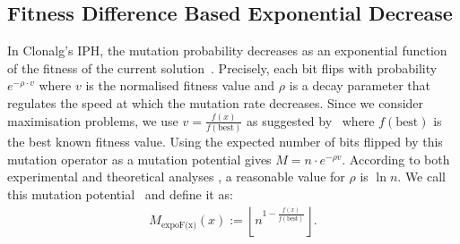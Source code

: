 \documentclass[lettersize,journal]{IEEEtran}
\begin{document}
 \subsection*{Fitness Difference Based Exponential Decrease}
 	In Clonalg's  %
 	IPH,  
 	the mutation probability decreases as an exponential function of the fitness of the current solution~\cite{DecastroVonzuben2002}. %
 	Precisely, each bit %
 	flips with probability $e^{-\rho \cdot v}$ where $v$ is the normalised fitness value and $\rho$ is a decay parameter that regulates the speed at which the mutation rate  decreases.
 Since we consider maximisation problems, we use $v=\frac{f(x)}{f(\text{best})}$ as suggested by~\cite{Zarges2008} where $f(\text{best})$ is the best known fitness value. Using the expected number of bits flipped by this mutation operator as a mutation potential gives $M=n \cdot e^{-\rho  v}$. According to both experimental and theoretical analyses 
 \cite{Zarges2008}, a reasonable value for $\rho$ is $\ln n$. We call this mutation potential~{\expoF } and define it as:
 \begin{align*} %
 M_{\text{expoF(x)}}(x):=\left\lfloor n^{1-\frac{f(x)}{f(\text{best})}} \right\rfloor.
 \end{align*}
 
 
\end{document}
